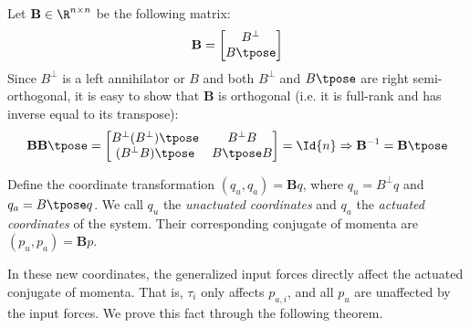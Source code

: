 Let \(\mathbf{B} \in \R^{n\times n}\) be the following matrix:
\[
    \mathbf{B} = 
    \begin{bmatrix}
        B^\perp \\
        B\tpose \\
    \end{bmatrix}
\]
Since \(B^\perp\) is a left annihilator or \(B\) and both \(B^\perp\) and
\(B\tpose\) are right semi-orthogonal, it is easy to show that \(\mathbf{B}\) is
orthogonal (i.e. it is full-rank and has inverse equal to its transpose):
\[
    \mathbf{B}\mathbf{B}\tpose = 
    \begin{bmatrix}
        B^\perp (B^\perp)\tpose & B^\perp B \\
        (B^\perp B)\tpose & B\tpose B
    \end{bmatrix} = \Id{n}
    \Rightarrow
    \mathbf{B}^{-1} = \mathbf{B}\tpose
\]

\begin{defn}
    Define the coordinate transformation 
    \((q_u,q_a) = \mathbf{B}q\), where \(q_u = B^\perp q\)
    and \(q_a = B\tpose q\).
    We call \(q_u\) the \textit{unactuated coordinates} and \(q_a\) the
    \textit{actuated coordinates} of the system. 
    Their corresponding conjugate of momenta are 
    \((p_u,p_a) = \mathbf{B}p\).
\end{defn}

In these new coordinates, the generalized input forces directly affect the
actuated conjugate of momenta. That is, \(\tau_i\) only affects \(p_{a,i}\), 
and all \(p_u\) are unaffected by the input forces. We prove this fact through
the following theorem.

